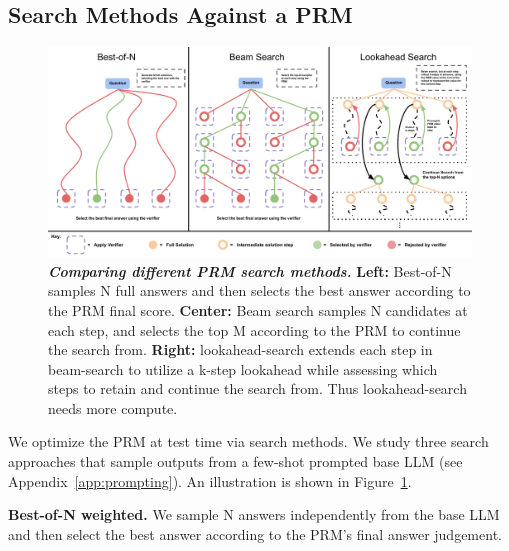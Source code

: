 \subsection{Search Methods Against a PRM}
\vspace{-0.15cm}
\begin{figure}[t]
    \centering
    \vspace{-0.2cm}
    \includegraphics[width=0.95\linewidth]{figures/Search_Figure-2.pdf}
    \vspace{-0.25cm}
    \caption{\footnotesize{\textbf{\emph{Comparing different PRM search methods.}} \textbf{Left:} Best-of-N samples N full answers and then selects the best answer according to the PRM final score. \textbf{Center:} Beam search samples N candidates at each step, and selects the top M according to the PRM to continue the search from. \textbf{Right:} lookahead-search extends each step in beam-search to utilize a k-step lookahead while assessing which steps to retain and continue the search from. Thus lookahead-search needs more compute.}}
    \label{fig:search_methods}
    \vspace{-0.2cm}
\end{figure}
We optimize the PRM at test time via search methods. We study three search approaches that sample outputs from a few-shot prompted base LLM (see Appendix~\ref{app:prompting}). An illustration is shown in Figure~\ref{fig:search_methods}.

\textbf{Best-of-N weighted.} We sample N answers independently from the base LLM and then select the best answer according to the PRM's final answer judgement.

